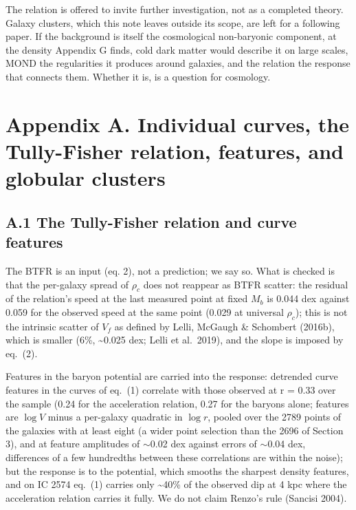 \documentclass[
  10pt,
]{article}
\begin{document}
The relation is offered to invite further investigation, not as a completed theory. Galaxy clusters, which this note leaves outside its scope, are left for a following paper. If the background is itself the cosmological non-baryonic component, at the density Appendix G finds, cold dark matter would describe it on large scales, MOND the regularities it produces around galaxies, and the relation the response that connects them. Whether it is, is a question for cosmology.

\section{Appendix A. Individual curves, the Tully-Fisher relation, features, and globular clusters}\label{appendix-a.-individual-curves-the-tully-fisher-relation-features-and-globular-clusters}

\subsection{A.1 The Tully-Fisher relation and curve features}\label{the-tully-fisher-relation-and-curve-features}

The BTFR is an input (eq. 2), not a prediction; we say so. What is checked is that the per-galaxy spread of $\rho_c$ does not reappear as BTFR scatter: the residual of the relation's speed at the last measured point at fixed $M_b$ is 0.044 dex against 0.059 for the observed speed at the same point (0.029 at universal $\rho_c$); this is not the intrinsic scatter of $V_f$ as defined by Lelli, McGaugh \& Schombert (2016b), which is smaller (6\%, \textasciitilde{}0.025 dex; Lelli et al.~2019), and the slope is imposed by eq.~(2).

Features in the baryon potential are carried into the response: detrended curve features in the curves of eq.~(1) correlate with those observed at r = 0.33 over the sample (0.24 for the acceleration relation, 0.27 for the baryons alone; features are $\log V$ minus a per-galaxy quadratic in $\log r$, pooled over the 2789 points of the galaxies with at least eight (a wider point selection than the 2696 of Section 3), and at feature amplitudes of $\sim$0.02 dex against errors of $\sim$0.04 dex, differences of a few hundredths between these correlations are within the noise); but the response is to the potential, which smooths the sharpest density features, and on IC 2574 eq.~(1) carries only \textasciitilde{}40\% of the observed dip at 4 kpc where the acceleration relation carries it fully. We do not claim Renzo's rule (Sancisi 2004).
\end{document}
